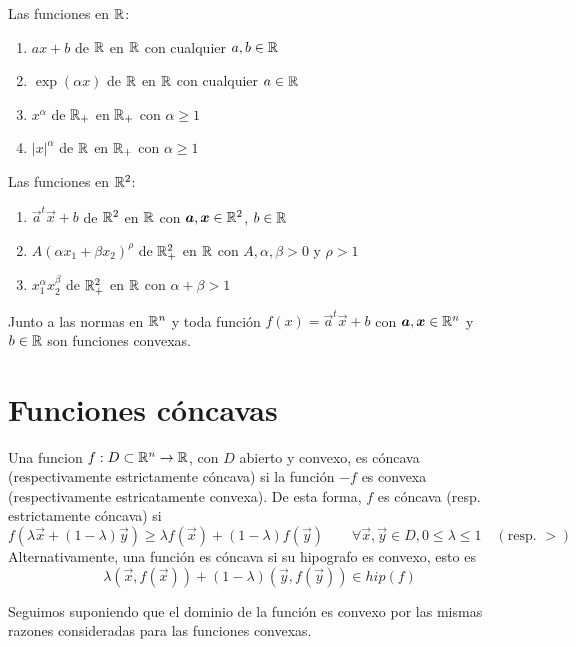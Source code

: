 \begin{ejemplo}
Las funciones en $\mathbb{R}$:
\begin{enumerate}
\item $ax+b$ de $\mathbb{R}$ en $\mathbb{R}$ con cualquier $a,b\in \mathbb{R}$
\item $\exp(\alpha x)$ de $\mathbb{R}$ en $\mathbb{R}$ con cualquier $a\in \mathbb{R}$
\item $x^\alpha$ de $\mathbb{R}_+$ en $\mathbb{R}_+$ con $\alpha \geq 1$
\item $|x|^\alpha$ de $\mathbb{R}$ en $\mathbb{R}_+$ con $\alpha \geq 1$
\end{enumerate}

Las funciones en $\mathbb{R}^2$:
\begin{enumerate}
\item $\vec{a}^t \vec{x} + b$ de $\mathbb{R}^2$ en $\mathbb{R}$ con $\boldsymbol{a},\boldsymbol{x}\in \mathbb{R}^2$, $b\in \mathbb{R}$
\item $A(\alpha x_1 + \beta x_2)^\rho$ de $\mathbb{R}_+^2$ en $\mathbb{R}$ con $A,\alpha,\beta > 0$ y $\rho > 1$
\item $x_1^{\alpha}x_2^{\beta}$ de $\mathbb{R}_+^2$ en $\mathbb{R}$ con $\alpha + \beta > 1$ 
\end{enumerate}

Junto a las normas en $\mathbb{R}^n$ y toda funci\'on $f(x)= \vec{a}^t \vec{x} + b$ con $\boldsymbol{a},\boldsymbol{x}\in \mathbb{R}^n$ y $b \in \mathbb{R}$ son funciones convexas. 
\end{ejemplo}

\section{Funciones c\'oncavas}

\begin{definicion}\label{def-fconcava}
Una funcion $f: D\subset \mathbb{R}^n \to \mathbb{R}$, con $D$ abierto y convexo, es c\'oncava  (respectivamente estrictamente c\'oncava) si la funci\'on $-f$ es convexa (respectivamente estricatamente convexa).
De esta forma, $f$ es c\'oncava (resp. estrictamente c\'oncava) si
$$f(\lambda \vec{x} + (1-\lambda) \vec{y}) \geq \lambda f(\vec{x}) + (1-\lambda) f(\vec{y}) \qquad \forall \vec{x},\vec{y} \in D , 0\leq \lambda \leq 1 \quad (\text{resp. }>)$$
Alternativamente, una funci\'on es c\'oncava si su hipografo es convexo, esto es
$$\lambda (\vec{x},f(\vec{x})) + (1-\lambda)(\vec{y},f(\vec{y}))\in hip(f)$$
\end{definicion}

\begin{nota}
Seguimos suponiendo que el dominio de la funci\'on es convexo por las mismas razones consideradas para las funciones convexas.%
\end{nota}

